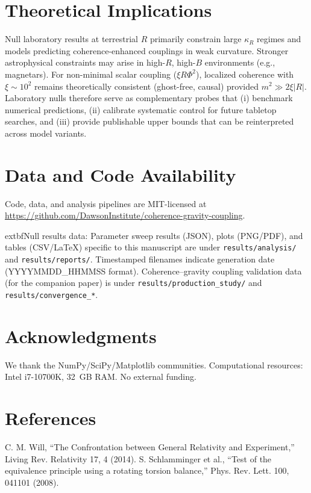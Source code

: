 \documentclass[10pt,twocolumn]{article}
\begin{document}
\section{Theoretical Implications}
Null laboratory results at terrestrial $R$ primarily constrain large \(\kappa_R\) regimes and models predicting coherence-enhanced couplings in weak curvature. Stronger astrophysical constraints may arise in high-$R$, high-$B$ environments (e.g., magnetars). For non-minimal scalar coupling ($\xi R\Phi^2$), localized coherence with $\xi\sim10^2$ remains theoretically consistent (ghost-free, causal) provided $m^2\!\gg\!2\xi|R|$. Laboratory nulls therefore serve as complementary probes that (i) benchmark numerical predictions, (ii) calibrate systematic control for future tabletop searches, and (iii) provide publishable upper bounds that can be reinterpreted across model variants.

\section{Data and Code Availability}
Code, data, and analysis pipelines are MIT-licensed at\: \url{https://github.com/DawsonInstitute/coherence-gravity-coupling}. 

	extbf{Null results data:} Parameter sweep results (JSON), plots (PNG/PDF), and tables (CSV/LaTeX) specific to this manuscript are under \texttt{results/analysis/} and \texttt{results/reports/}. Timestamped filenames indicate generation date (YYYYMMDD\_HHMMSS format). Coherence--gravity coupling validation data (for the companion paper) is under \texttt{results/production\_study/} and \texttt{results/convergence\_*}.

\section*{Acknowledgments}
We thank the NumPy/SciPy/Matplotlib communities. Computational resources: Intel i7-10700K, 32~GB RAM. No external funding.

\section*{References}
\begin{thebibliography}{9}
 C. M. Will, ``The Confrontation between General Relativity and Experiment,'' Living Rev. Relativity 17, 4 (2014).
 S. Schlamminger et al., ``Test of the equivalence principle using a rotating torsion balance,'' Phys. Rev. Lett. 100, 041101 (2008).
\end{thebibliography}
\end{document}
